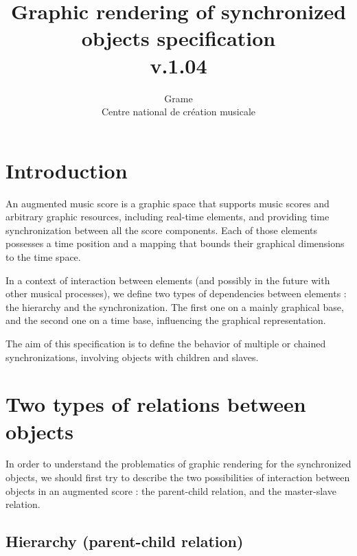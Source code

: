 \documentclass[a4paper]{article}
\begin{document}
\title{Graphic rendering of synchronized objects specification \\ v.1.04}


\author{Grame \\ Centre national de cr\'eation musicale}

\maketitle

\section*{Introduction}\label{sec:intro}

An augmented music score is a graphic space that supports music scores and arbitrary graphic resources, including real-time elements, and providing time synchronization between all the score components. Each of those elements possesses a time position and a mapping that bounds their graphical dimensions to the time space.

In a context of interaction between elements (and possibly in the future with other musical processes), we define two types of dependencies between elements : the hierarchy and the synchronization. The first one on a mainly graphical base, and the second one on a time base, influencing the graphical representation.

The aim of this specification is to define the behavior of multiple or chained synchronizations, involving objects with children and slaves.

\section{Two types of relations between objects}\label{sec:relations}

In order to understand the problematics of graphic rendering for the synchronized objects, we should first try to describe the two possibilities of interaction between objects in an augmented score : the parent-child relation, and the master-slave relation. 

\subsection{Hierarchy (parent-child relation)}\label{subsec:hierarchy}
\end{document}
